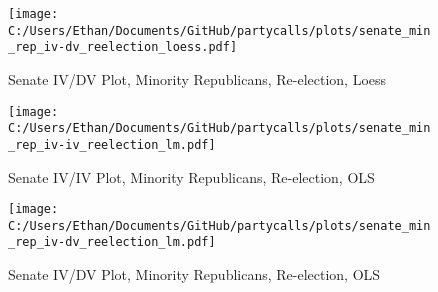 \documentclass[12pt]{article}
\begin{document}
\begin{figure}[H]
	\centering
	\caption{Senate IV/DV Plot, Minority Republicans, Re-election, Loess}
	\texttt{[image: C:/Users/Ethan/Documents/GitHub/partycalls/plots/senate\_min\_rep\_iv-dv\_reelection\_loess.pdf]}
\end{figure}

\begin{figure}[H]
	\centering
	\caption{Senate IV/IV Plot, Minority Republicans, Re-election, OLS}
	\texttt{[image: C:/Users/Ethan/Documents/GitHub/partycalls/plots/senate\_min\_rep\_iv-iv\_reelection\_lm.pdf]}
\end{figure}

\begin{figure}[H]
	\centering
	\caption{Senate IV/DV Plot, Minority Republicans, Re-election, OLS}
	\texttt{[image: C:/Users/Ethan/Documents/GitHub/partycalls/plots/senate\_min\_rep\_iv-dv\_reelection\_lm.pdf]}
\end{figure}
\end{document}
